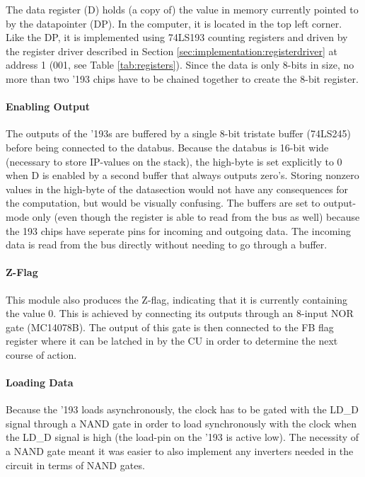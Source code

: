 The data register (D) holds (a copy of) the value in memory currently pointed to by the datapointer (DP). In the computer, it is located in the top left corner. Like the DP, it is implemented using 74LS193 counting registers and driven by the register driver described in Section \ref{sec:implementation:registerdriver} at address 1 (001, see Table \ref{tab:registers}). Since the data is only 8-bits in size, no more than two '193 chips have to be chained together to create the 8-bit register. 

\paragraph{Enabling Output} The outputs of the '193s are buffered by a single 8-bit tristate buffer (74LS245) before being connected to the databus. Because the databus is 16-bit wide (necessary to store IP-values on the stack), the high-byte is set explicitly to 0 when D is enabled by a second buffer that always outputs zero's. Storing nonzero values in the high-byte of the datasection would not have any consequences for the computation, but would be visually confusing. The buffers are set to output-mode only (even though the register is able to read from the bus as well) because the 193 chips have seperate pins for incoming and outgoing data. The incoming data is read from the bus directly without needing to go through a buffer.

\paragraph{Z-Flag} This module also produces the Z-flag, indicating that it is currently containing the value 0. This is achieved by connecting its outputs through an 8-input NOR gate (MC14078B). The output of this gate is then connected to the FB flag register where it can be latched in by the CU in order to determine the next course of action.

\paragraph{Loading Data} Because the '193 loads asynchronously, the clock has to be gated with the LD\_D signal through a NAND gate in order to load synchronously with the clock when the LD\_D signal is high (the load-pin on the '193 is active low). The necessity of a NAND gate meant it was easier to also implement any inverters needed in the circuit in terms of NAND gates.


